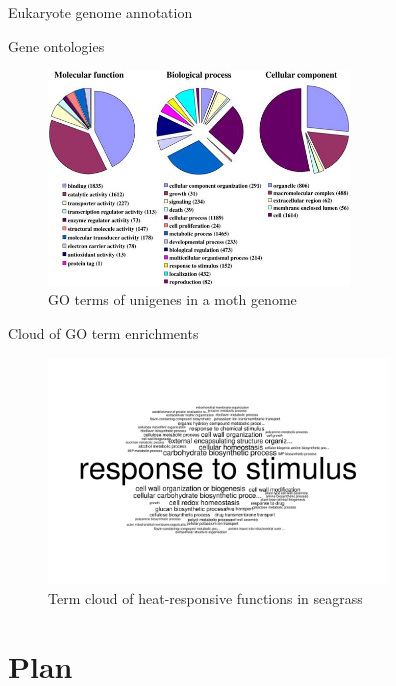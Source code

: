 \documentclass[presentation]{beamer}
\begin{document}
\begin{frame}[label=sec-4-1-6]{Eukaryote genome annotation}
\begin{center}
\begin{figure}[htb]
\begin{tikzpicture}
\end{tikzpicture}
\end{figure}
\end{center}
\end{frame}
\begin{frame}[label=sec-4-1-7]{Gene ontologies}
\begin{center}

\begin{figure}[htb]
\centering
\includegraphics[width=8cm]{Jacquin-Joly-Fig1.jpg}
\caption{GO terms of unigenes in a moth genome}
\end{figure}

\tiny{\citep{Jacquin2012}}
\end{center}
\end{frame}



\begin{frame}[label=sec-4-1-8]{Cloud of GO term enrichments}
\begin{figure}[htb]
\centering
\includegraphics[width=9cm]{t3c1BPincreased.png}
\caption{Term cloud of heat-responsive functions in seagrass}
\end{figure}
\end{frame}

\section{Plan}
\label{sec-5}
\end{document}
